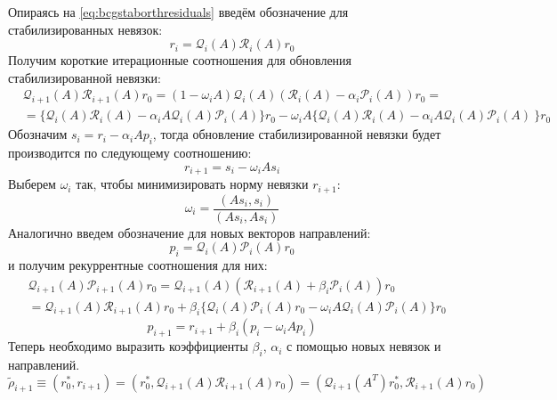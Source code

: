 \par Опираясь на \eqref{eq:bcgstaborthresiduals} введём обозначение для стабилизированных
невязок: 
\begin{equation}
    \label{eq:bcgstabresstab}
    r_i = \mathcal{Q}_i(A)\mathcal{R}_i(A)r_0
\end{equation}
Получим короткие итерационные соотношения для обновления стабилизированной невязки:
\begin{align*}
    &\mathcal{Q}_{i+1}(A)\mathcal{R}_{i+1}(A)r_0  = (1-\omega_iA)\mathcal{Q}_{i}(A)(\mathcal{R}_i(A)-\alpha_i \mathcal{P}_i(A))r_0 = \\
    &= \{\mathcal{Q}_{i}(A)\mathcal{R}_{i}(A) - \alpha_i A \mathcal{Q}_{i}(A)\mathcal{P}_{i}(A)\}r_0 -\omega_iA\{ \mathcal{Q}_{i}(A)\mathcal{R}_{i}(A) - \alpha_i A \mathcal{Q}_{i}(A)\mathcal{P}_{i}(A)\ \}r_0
\end{align*}
Обозначим $s_i = r_i - \alpha_i A p_i$, тогда обновление стабилизированной невязки будет производится по следующему соотношению:
\begin{equation}
    \label{eq:bcgstabresupdate}
    r_{i+1} = s_i - \omega_i A s_i
\end{equation}
Выберем $\omega_i$ так, чтобы минимизировать норму невязки $r_{i+1}$:
\begin{equation}
    \omega_i = \frac{(As_i,s_i)}{(As_i,As_i)}
\end{equation}
Аналогично введем обозначение для новых векторов направлений:
\begin{equation}
    p_i = \mathcal{Q}_i(A) \mathcal{P}_i(A) r_0
\end{equation}
и получим рекуррентные соотношения для них:
\begin{align*}
    &\mathcal{Q}_{i+1}(A)\mathcal{P}_{i+1}(A)r_0 = \mathcal{Q}_{i+1}(A)(\mathcal{R}_{i+1}(A)+\beta_i\mathcal{P}_{i}(A))r_0 \\
    &= \mathcal{Q}_{i+1}(A)\mathcal{R}_{i+1}(A)r_0 + \beta_i\{\mathcal{Q}_{i}(A)\mathcal{P}_{i}(A)r_0-\omega_iA\mathcal{Q}_{i}(A)\mathcal{P}_{i}(A)\}r_0
\end{align*}
\begin{equation}
    \label{eq:bsgstabpupdate}
    p_{i+1} = r_{i+1} + \beta_i(p_i - \omega_i Ap_i)
\end{equation}
Теперь необходимо выразить коэффициенты $\beta_i$, $\alpha_i$ с помощью новых невязок и направлений. 
\begin{equation*}
    \tilde{\rho}_{i+1} \equiv (r_0^*, r_{i+1}) = (r_0^*, \mathcal{Q}_{i+1}(A)\mathcal{R}_{i+1}(A)r_0) = (\mathcal{Q}_{i+1}(A^T)r_0^*, \mathcal{R}_{i+1}(A)r_0)
\end{equation*} 
